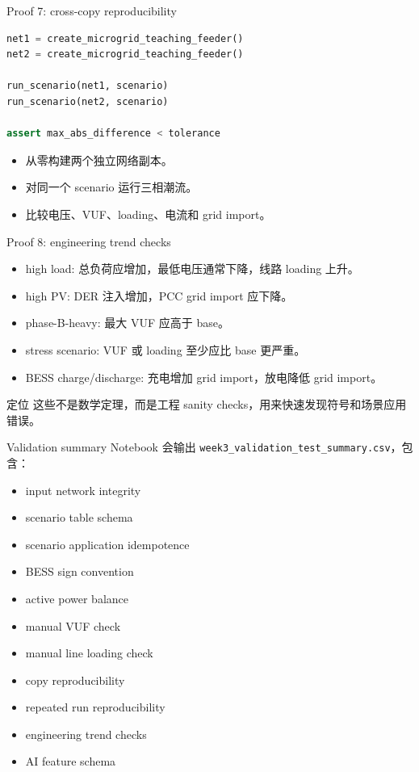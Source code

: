 \documentclass[aspectratio=169,11pt]{beamer}
\begin{document}
\begin{frame}[fragile]{Proof 7: cross-copy reproducibility}
\begin{lstlisting}[language=Python]
net1 = create_microgrid_teaching_feeder()
net2 = create_microgrid_teaching_feeder()

run_scenario(net1, scenario)
run_scenario(net2, scenario)

assert max_abs_difference < tolerance
\end{lstlisting}
\begin{itemize}
  \item 从零构建两个独立网络副本。
  \item 对同一个 scenario 运行三相潮流。
  \item 比较电压、VUF、loading、电流和 grid import。
\end{itemize}
\end{frame}

\begin{frame}{Proof 8: engineering trend checks}
\begin{itemize}
  \item high load: 总负荷应增加，最低电压通常下降，线路 loading 上升。
  \item high PV: DER 注入增加，PCC grid import 应下降。
  \item phase-B-heavy: 最大 VUF 应高于 base。
  \item stress scenario: VUF 或 loading 至少应比 base 更严重。
  \item BESS charge/discharge: 充电增加 grid import，放电降低 grid import。
\end{itemize}
\begin{block}{定位}
这些不是数学定理，而是工程 sanity checks，用来快速发现符号和场景应用错误。
\end{block}
\end{frame}

\begin{frame}{Validation summary}
Notebook 会输出 \texttt{week3\_validation\_test\_summary.csv}，包含：
\begin{itemize}
  \item input network integrity
  \item scenario table schema
  \item scenario application idempotence
  \item BESS sign convention
  \item active power balance
  \item manual VUF check
  \item manual line loading check
  \item copy reproducibility
  \item repeated run reproducibility
  \item engineering trend checks
  \item AI feature schema
\end{itemize}
\end{frame}
\end{document}
